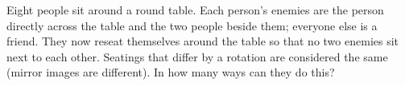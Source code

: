 Eight people sit around a round table. Each person's enemies are the person directly across the table and the two people beside them; everyone else is a friend. They now reseat themselves around the table so that no two enemies sit next to each other. Seatings that differ by a rotation are considered the same (mirror images are different). In how many ways can they do this?
